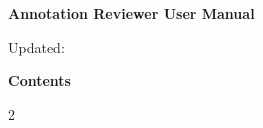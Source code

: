 \documentclass[UTF8,a4paper,zihao=5,fontset=none,twoside,openany]{ctexrep}
\begin{document}
\thispagestyle{plain}
\hypertarget{manual-contents}{}
\begingroup
\setlength{\parskip}{0pt}
\setlength{\multicolsep}{0pt}
{\centering\rmfamily\headingfont\bfseries\fontsize{22}{26}\selectfont\color{accent} Annotation Reviewer User Manual\par}
{\centering\small Updated: \ManualDate\par}
\vspace{3pt}
{\rmfamily\headingfont\fontsize{12}{14.4}\selectfont\bfseries Contents\par}
\begin{multicols}{2}
\manualtoc
\end{multicols}
\endgroup
\cleardoublepage
{}

\end{document}
